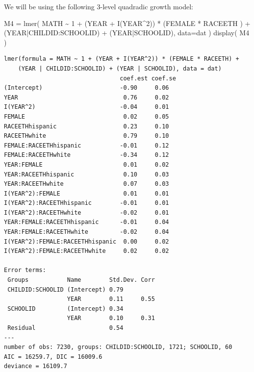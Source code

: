 \documentclass[
  letterpaper,
  DIV=11,
  numbers=noendperiod]{scrreprt}
\newenvironment{Shaded}{}{}
\newcommand{\AttributeTok}[1]{\textcolor[rgb]{0.49,0.56,0.16}{#1}}
\newcommand{\DecValTok}[1]{\textcolor[rgb]{0.25,0.63,0.44}{#1}}
\newcommand{\FunctionTok}[1]{\textcolor[rgb]{0.02,0.16,0.49}{#1}}
\newcommand{\NormalTok}[1]{#1}
\newcommand{\OtherTok}[1]{\textcolor[rgb]{0.00,0.44,0.13}{#1}}
\newcommand{\SpecialCharTok}[1]{\textcolor[rgb]{0.25,0.44,0.63}{#1}}
\begin{document}
We will be using the following 3-level quadradic growth model:

\begin{Shaded}
\begin{Highlighting}[]
\NormalTok{M4 }\OtherTok{=} \FunctionTok{lmer}\NormalTok{( MATH }\SpecialCharTok{\textasciitilde{}} \DecValTok{1} \SpecialCharTok{+}\NormalTok{ (YEAR }\SpecialCharTok{+} \FunctionTok{I}\NormalTok{(YEAR}\SpecialCharTok{\^{}}\DecValTok{2}\NormalTok{)) }\SpecialCharTok{*}\NormalTok{ (FEMALE }\SpecialCharTok{*}\NormalTok{ RACEETH ) }\SpecialCharTok{+} 
\NormalTok{                (YEAR}\SpecialCharTok{|}\NormalTok{CHILDID}\SpecialCharTok{:}\NormalTok{SCHOOLID) }\SpecialCharTok{+}\NormalTok{ (YEAR}\SpecialCharTok{|}\NormalTok{SCHOOLID), }\AttributeTok{data=}\NormalTok{dat )}
\FunctionTok{display}\NormalTok{( M4 )}
\end{Highlighting}
\end{Shaded}

\begin{verbatim}
lmer(formula = MATH ~ 1 + (YEAR + I(YEAR^2)) * (FEMALE * RACEETH) + 
    (YEAR | CHILDID:SCHOOLID) + (YEAR | SCHOOLID), data = dat)
                                 coef.est coef.se
(Intercept)                      -0.90     0.06  
YEAR                              0.76     0.02  
I(YEAR^2)                        -0.04     0.01  
FEMALE                            0.02     0.05  
RACEETHhispanic                   0.23     0.10  
RACEETHwhite                      0.79     0.10  
FEMALE:RACEETHhispanic           -0.01     0.12  
FEMALE:RACEETHwhite              -0.34     0.12  
YEAR:FEMALE                       0.01     0.02  
YEAR:RACEETHhispanic              0.10     0.03  
YEAR:RACEETHwhite                 0.07     0.03  
I(YEAR^2):FEMALE                  0.01     0.01  
I(YEAR^2):RACEETHhispanic        -0.01     0.01  
I(YEAR^2):RACEETHwhite           -0.02     0.01  
YEAR:FEMALE:RACEETHhispanic      -0.01     0.04  
YEAR:FEMALE:RACEETHwhite         -0.02     0.04  
I(YEAR^2):FEMALE:RACEETHhispanic  0.00     0.02  
I(YEAR^2):FEMALE:RACEETHwhite     0.02     0.02  

Error terms:
 Groups           Name        Std.Dev. Corr 
 CHILDID:SCHOOLID (Intercept) 0.79          
                  YEAR        0.11     0.55 
 SCHOOLID         (Intercept) 0.34          
                  YEAR        0.10     0.31 
 Residual                     0.54          
---
number of obs: 7230, groups: CHILDID:SCHOOLID, 1721; SCHOOLID, 60
AIC = 16259.7, DIC = 16009.6
deviance = 16109.7 
\end{verbatim}
\end{document}

